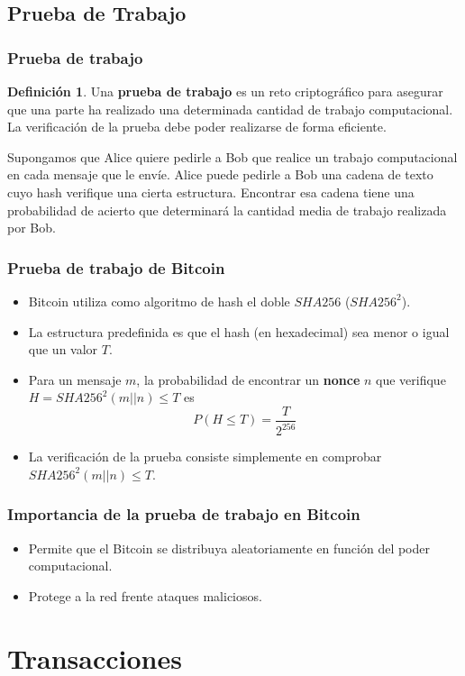 \documentclass{beamer}
\theoremstyle{definition}
\newtheorem{defi}{Definición}
\begin{document}
\subsection{Prueba de Trabajo}
\begin{frame}
\frametitle{Prueba de trabajo}
\begin{defi}
	Una \textbf{prueba de trabajo} es un reto criptográfico para asegurar que una parte ha realizado una determinada cantidad de trabajo computacional. La verificación de la prueba debe poder realizarse de forma eficiente.
\end{defi}\pause

Supongamos que Alice quiere pedirle a Bob que realice un trabajo computacional en cada mensaje que le envíe. Alice puede pedirle a Bob una cadena de texto cuyo hash verifique una cierta estructura. Encontrar esa cadena tiene una probabilidad de acierto que determinará la cantidad media de trabajo realizada por Bob.
\end{frame}

\begin{frame}
	\frametitle{Prueba de trabajo de Bitcoin}
	\begin{itemize}
	\item<1-> Bitcoin utiliza como algoritmo de hash el doble $SHA256$ ($SHA256^2$).
	\item<2-> La estructura predefinida es que el hash (en hexadecimal) sea menor o igual que un valor $T$.
	\item<3-> Para un mensaje $m$, la probabilidad de encontrar un \textbf{nonce} $n$ que verifique $H=SHA256^2(m||n)\leq T$ es
	$$P(H\leq T)=\frac{T}{2^{256}}$$
	\item<4-> La verificación de la prueba consiste simplemente en comprobar $SHA256^2(m||n)\leq T$.
	\end{itemize}
\end{frame}

\begin{frame}
\frametitle{Importancia de la prueba de trabajo en Bitcoin}
\begin{itemize}
	\item Permite que el Bitcoin se distribuya aleatoriamente en función del poder computacional. %
	\item Protege a la red frente ataques maliciosos. %
\end{itemize}
\end{frame}


\section{Transacciones}
\end{document}

